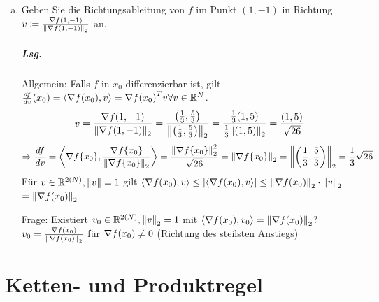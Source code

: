 \documentclass{scrreprt}
\newcommand\skalprod[1]{\left\langle #1 \right\rangle}
\begin{document}
\begin{enumerate}[a)]
 \newpage
\item Geben Sie die Richtungsableitung von $f$ im Punkt $(1, -1)$ in Richtung
  $v \coloneqq \frac{\nabla f(1, -1)}{\norm{\nabla f(1, -1)}_2}$ an.
  \subparagraph{Lsg.} Allgemein: Falls $f$ in $x_0$ differenzierbar ist, gilt
  $\frac{df}{dv} (x_0) = \skalprod{\nabla f\qty(x_0), v} = \nabla f\qty(x_0)^T v \forall v \in \mathbb{R}^N$.
  \[
    v = \frac{\nabla f(1, -1)}{\norm{\nabla f(1, -1)}_2}
    = \frac{\qty(\frac{1}{3}, \frac{5}{3})}{\norm{\qty(\frac{1}{3}, \frac{5}{3})}_2}
    = \frac{\frac{1}{3}(1,5)}{\frac{1}{3} \norm{(1, 5)}_2} = \frac{(1, 5)}{\sqrt{26}}
  \]
  \[
    \Rightarrow \frac{df}{dv} = \skalprod{\nabla f\qty{x_0}, \frac{\nabla f\qty{x_0}}{\norm{\nabla f\qty{x_0}}_2}}
    = \frac{\norm{\nabla f\qty{x_0}}_2^2}{\sqrt{26}}
    = \norm{\nabla f\qty{x_0}}_2 = \norm{\qty(\frac{1}{3}, \frac{5}{3})}_2
    = \frac{1}{3}\sqrt{26}
  \]
  Für $v \in \mathbb{R}^{2(N)}, \norm{v} = 1$ gilt
  $\skalprod{\nabla f\qty(x_0), v} \leq \abs{\skalprod{\nabla f\qty(x_0), v}} \leq \norm{\nabla f\qty(x_0)}_2 \cdot \norm{v}_2$
  $= \norm{\nabla f\qty(x_0)}_2$.

  Frage: Existiert $v_0 \in \mathbb{R}^{2(N)}, \norm{v}_2 = 1$ mit
  $\skalprod{\nabla f\qty(x_0), v_0} = \norm{\nabla f\qty(x_0)}_2$?
  $v_0 = \frac{\nabla f\qty(x_0)}{\norm{\nabla f\qty(x_0)}_2}$ für $\nabla f\qty(x_0) \ne 0$
  (Richtung des steilsten Anstiegs)
\end{enumerate}

\section*{Ketten- und Produktregel}
\end{document}
